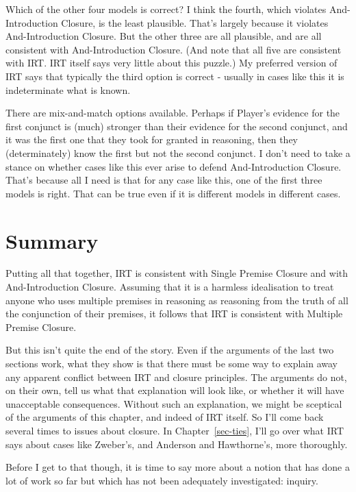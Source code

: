 \documentclass[
  10pt,
  letterpaper,
  twoside]{scrbook}
\begin{document}
Which of the other four models is correct? I think the fourth, which
violates And-Introduction Closure, is the least plausible. That's
largely because it violates And-Introduction Closure. But the other
three are all plausible, and are all consistent with And-Introduction
Closure. (And note that all five are consistent with IRT. IRT itself
says very little about this puzzle.) My preferred version of IRT says
that typically the third option is correct - usually in cases like this
it is indeterminate what is known.

There are mix-and-match options available. Perhaps if Player's evidence
for the first conjunct is (much) stronger than their evidence for the
second conjunct, and it was the first one that they took for granted in
reasoning, then they (determinately) know the first but not the second
conjunct. I don't need to take a stance on whether cases like this ever
arise to defend And-Introduction Closure. That's because all I need is
that for any case like this, one of the first three models is right.
That can be true even if it is different models in different cases.

\section{Summary}\label{sec-closuresummary}

Putting all that together, IRT is consistent with Single Premise Closure
and with And-Introduction Closure. Assuming that it is a harmless
idealisation to treat anyone who uses multiple premises in reasoning as
reasoning from the truth of all the conjunction of their premises, it
follows that IRT is consistent with Multiple Premise Closure.

But this isn't quite the end of the story. Even if the arguments of the
last two sections work, what they show is that there must be some way to
explain away any apparent conflict between IRT and closure principles.
The arguments do not, on their own, tell us what that explanation will
look like, or whether it will have unacceptable consequences. Without
such an explanation, we might be sceptical of the arguments of this
chapter, and indeed of IRT itself. So I'll come back several times to
issues about closure. In Chapter~\ref{sec-ties}, I'll go over what IRT
says about cases like Zweber's, and Anderson and Hawthorne's, more
thoroughly.

Before I get to that though, it is time to say more about a notion that
has done a lot of work so far but which has not been adequately
investigated: inquiry.
\end{document}
